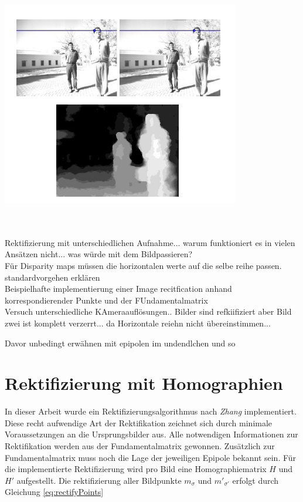 \begin{minipage}{\linewidth}
	\centering
	\includegraphics[width=.8\linewidth]{images/Disparity.png}
\end{minipage}\\ \\


Rektifizierung mit unterschiedlichen Aufnahme... warum funktioniert es in vielen Ansätzen nicht... was würde mit dem Bildpassieren? \\
Für Disparity maps müssen die horizontalen werte auf die selbe reihe passen. \cite{Javier,Fusiello}\\


standardvorgehen erklären\\

Beispielhafte implementierung einer Image recitfication anhand korrespondierender Punkte und der FUndamentalmatrix\\



Versuch unterschiedliche KAmeraauflösungen.. Bilder sind refkiifiziert aber Bild zwei ist komplett verzerrt... da Horizontale reiehn nicht übereinstimmen... 


Davor unbedingt erwähnen mit epipolen im undendlchen und so

\section{Rektifizierung mit Homographien}

In dieser Arbeit wurde ein Rektifizierungsalgorithmus nach \textit{Zhang}\cite{ZZ} implementiert. Diese recht aufwendige Art der Rektifikation zeichnet sich durch minimale Voraussetzungen an die Ursprungsbilder aus. Alle notwendigen Informationen zur Rektifikation werden aus der Fundamentalmatrix gewonnen. Zusätzlich zur Fundamentalmatrix muss noch die Lage der jeweiligen Epipole bekannt sein\cite{phdextrinsicPara}. Für die implementierte Rektifizierung wird pro Bild eine Homographiematrix $H$ und $H'$ aufgestellt. Die rektifizierung aller Bildpunkte $m_\sigma$ und $m'_{\sigma'}$ erfolgt durch Gleichung \ref{eq:rectifyPoints}

